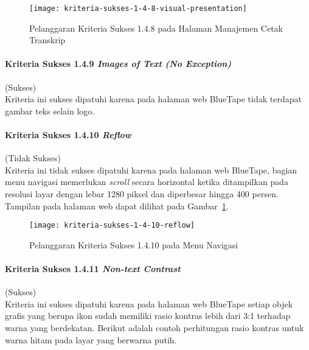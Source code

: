 \begin{figure}[H]
    \centering  
    \texttt{[image: kriteria-sukses-1-4-8-visual-presentation]}  
    \caption[Pelanggaran Kriteria Sukses 1.4.8 pada Halaman Manajemen Cetak Transkrip]{Pelanggaran Kriteria Sukses 1.4.8 pada Halaman Manajemen Cetak Transkrip}
    \label{fig:1.4.8_visual_presentation}  
\end{figure} 

\paragraph{Kriteria Sukses 1.4.9 \textit{Images of Text (No Exception)}}
\label{par:kepatuhan_bluetape_kriteria_sukses_1.4.9}
(Sukses)\\

Kriteria ini sukses dipatuhi karena pada halaman web BlueTape tidak terdapat gambar teks selain logo.

\paragraph{Kriteria Sukses 1.4.10 \textit{Reflow}}
\label{par:kepatuhan_bluetape_kriteria_sukses_1.4.10}
(Tidak Sukses)\\

Kriteria ini tidak sukses dipatuhi karena pada halaman web BlueTape, bagian menu navigasi memerlukan \textit{scroll} secara horizontal ketika ditampilkan pada resolusi layar dengan lebar 1280 piksel dan diperbesar hingga 400 persen. Tampilan pada halaman web dapat dilihat pada \mbox{Gambar \ref{fig:1.4.8_visual_presentation}}.

\begin{figure}[H]
    \centering  
    \texttt{[image: kriteria-sukses-1-4-10-reflow]}  
    \caption[Pelanggaran Kriteria Sukses 1.4.10 pada Menu Navigasi]{Pelanggaran Kriteria Sukses 1.4.10 pada Menu Navigasi}
    \label{fig:1.4.10_reflow}  
\end{figure} 

\paragraph{Kriteria Sukses 1.4.11 \textit{Non-text Contrast}}
\label{par:kepatuhan_bluetape_kriteria_sukses_1.4.11}
(Sukses)\\

Kriteria ini sukses dipatuhi karena pada halaman web BlueTape setiap objek grafis yang berupa ikon sudah memiliki rasio kontras lebih dari 3:1 terhadap warna yang berdekatan. Berikut adalah contoh perhitungan rasio kontras untuk warna hitam pada layar yang berwarna putih.

